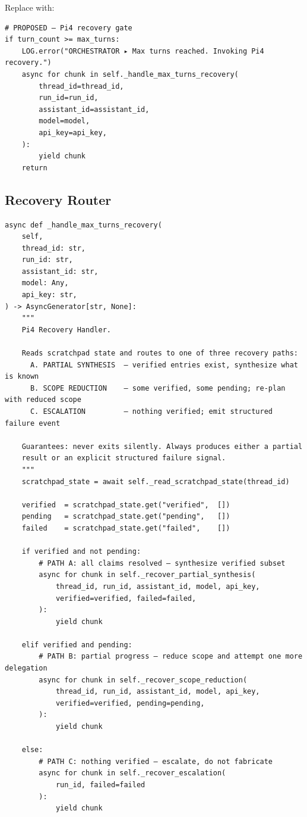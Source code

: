 Replace with:

\begin{verbatim}
# PROPOSED — Pi4 recovery gate
if turn_count >= max_turns:
    LOG.error("ORCHESTRATOR ▸ Max turns reached. Invoking Pi4 recovery.")
    async for chunk in self._handle_max_turns_recovery(
        thread_id=thread_id,
        run_id=run_id,
        assistant_id=assistant_id,
        model=model,
        api_key=api_key,
    ):
        yield chunk
    return
\end{verbatim}

\subsection*{Recovery Router}

\begin{verbatim}
async def _handle_max_turns_recovery(
    self,
    thread_id: str,
    run_id: str,
    assistant_id: str,
    model: Any,
    api_key: str,
) -> AsyncGenerator[str, None]:
    """
    Pi4 Recovery Handler.

    Reads scratchpad state and routes to one of three recovery paths:
      A. PARTIAL SYNTHESIS  — verified entries exist, synthesize what is known
      B. SCOPE REDUCTION    — some verified, some pending; re-plan with reduced scope
      C. ESCALATION         — nothing verified; emit structured failure event

    Guarantees: never exits silently. Always produces either a partial
    result or an explicit structured failure signal.
    """
    scratchpad_state = await self._read_scratchpad_state(thread_id)

    verified  = scratchpad_state.get("verified",  [])
    pending   = scratchpad_state.get("pending",   [])
    failed    = scratchpad_state.get("failed",    [])

    if verified and not pending:
        # PATH A: all claims resolved — synthesize verified subset
        async for chunk in self._recover_partial_synthesis(
            thread_id, run_id, assistant_id, model, api_key,
            verified=verified, failed=failed,
        ):
            yield chunk

    elif verified and pending:
        # PATH B: partial progress — reduce scope and attempt one more delegation
        async for chunk in self._recover_scope_reduction(
            thread_id, run_id, assistant_id, model, api_key,
            verified=verified, pending=pending,
        ):
            yield chunk

    else:
        # PATH C: nothing verified — escalate, do not fabricate
        async for chunk in self._recover_escalation(
            run_id, failed=failed
        ):
            yield chunk
\end{verbatim}

